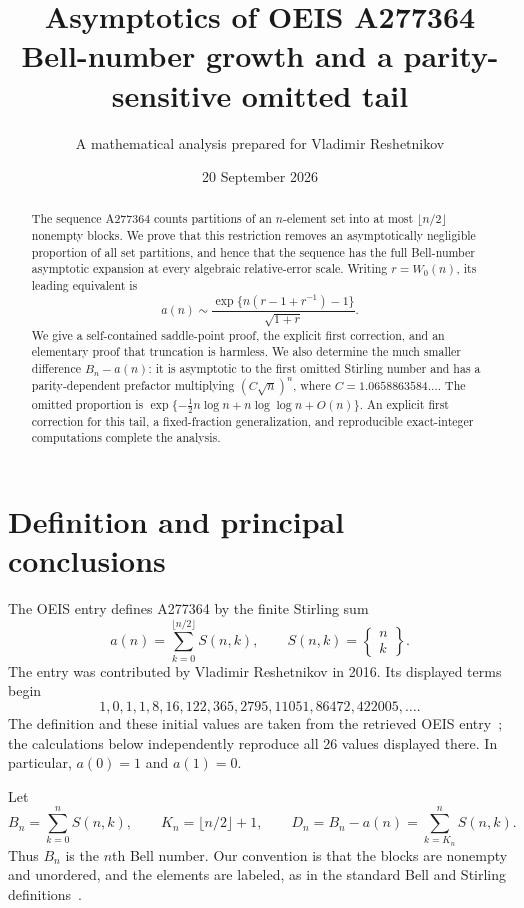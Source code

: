 \documentclass[11pt,a4paper]{article}
\title{\color{ink}\bfseries Asymptotics of OEIS A277364\\[5pt]
\large Bell-number growth and a parity-sensitive omitted tail}
\author{A mathematical analysis prepared for Vladimir Reshetnikov}
\date{20 September 2026}
\numberwithin{equation}{section}
\theoremstyle{remark}
\newcommand{\Stir}[2]{\left\{\begin{matrix}#1\\#2\end{matrix}\right\}}
\begin{document}
\maketitle
\begin{abstract}
The sequence A277364 counts partitions of an $n$-element set into at most
$\lfloor n/2\rfloor$ nonempty blocks. We prove that this restriction removes an
asymptotically negligible proportion of all set partitions, and hence that the
sequence has the full Bell-number asymptotic expansion at every algebraic
relative-error scale. Writing $r=W_0(n)$, its leading equivalent is
\[
 a(n)\sim\frac{\exp\{n(r-1+r^{-1})-1\}}{\sqrt{1+r}}.
\]
We give a self-contained saddle-point proof, the explicit first correction,
and an elementary proof that truncation is harmless. We also determine the
much smaller difference $B_n-a(n)$: it is asymptotic to the first omitted
Stirling number and has a parity-dependent prefactor multiplying
$(C\sqrt n)^n$, where $C=1.0658863584\ldots$. The omitted proportion is
$\exp\{-\tfrac12n\log n+n\log\log n+O(n)\}$.
An explicit first correction for this tail, a fixed-fraction generalization,
and reproducible exact-integer computations complete the analysis.
\end{abstract}

\section{Definition and principal conclusions}

The OEIS entry defines A277364 by the finite Stirling sum
\begin{equation}\label{eq:def}
 a(n)=\sum_{k=0}^{\lfloor n/2\rfloor}S(n,k),
 \qquad S(n,k)=\Stir nk.
\end{equation}
The entry was contributed by Vladimir Reshetnikov in 2016. Its displayed
terms begin
\[
1,0,1,1,8,16,122,365,2795,11051,86472,422005,\ldots.
\]
The definition and these initial values are taken from the retrieved OEIS
entry~\cite{oeis}; the calculations below independently reproduce all 26
values displayed there. In particular, $a(0)=1$ and $a(1)=0$.

Let
\begin{equation}\label{eq:taildef}
 B_n=\sum_{k=0}^nS(n,k),\qquad
 K_n=\lfloor n/2\rfloor+1,\qquad
 D_n=B_n-a(n)=\sum_{k=K_n}^n S(n,k).
\end{equation}
Thus $B_n$ is the $n$th Bell number. Our convention is that the blocks are
nonempty and unordered, and the elements are labeled, as in the standard
Bell and Stirling definitions~\cite{dlmf-bell,dlmf-stirling}.
\end{document}
